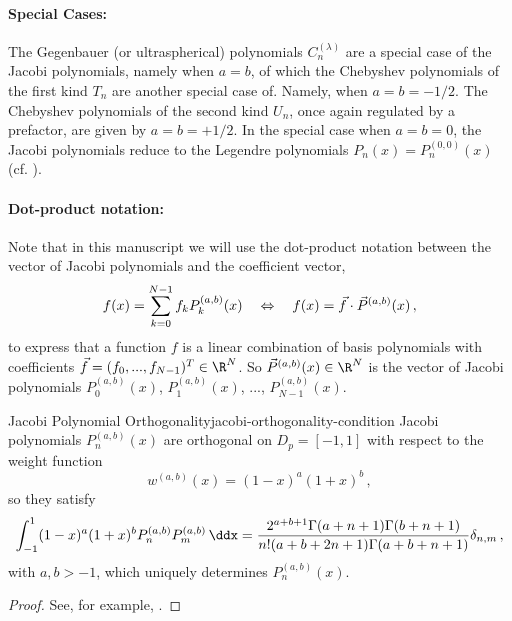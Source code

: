 \paragraph{Special Cases:}
The Gegenbauer (or ultraspherical) polynomials $C_n^{(\lambda)}$ are a special case of the Jacobi polynomials, namely when $a = b$,
of which the Chebyshev polynomials of the first kind $T_n$ are another special case of.
Namely, when $a = b = -1/2$.
The Chebyshev polynomials of the second kind $U_n$, once again regulated by a prefactor, are given by $a = b = +1/2$.
In the special case when $a = b = 0$, the Jacobi polynomials reduce to the Legendre polynomials $P_n(x) = P_n^{(0, 0)}(x)$ (cf. \cite{2018-nist}).


\paragraph{Dot-product notation:}
Note that in this manuscript we will use the dot-product notation between the vector of Jacobi polynomials and the coefficient vector,
$$f(x) = \sum_{k=0}^{N-1} f_k P_k^{(a, b)}(x) \quad\Leftrightarrow\quad f(x) = \vec{f} \cdot \vec{P}^{(a, b)}(x)\,,$$
to express that a function $f$ is a linear combination of basis polynomials with coefficients $\vec{f} = (f_0, ..., f_{N-1})^T \in \R^N$.
So $\vec{P}^{(a, b)}(x) \in \R^N$ is the vector of Jacobi polynomials $P^{(a, b)}_0(x)$, $P^{(a, b)}_1(x)$, ..., $P^{(a, b)}_{N-1}(x)$.

\begin{theorem}{Jacobi Polynomial Orthogonality}{jacobi-orthogonality-condition}
  Jacobi polynomials $P_n^{(a,b)}(x)$ are orthogonal on $D_p = [-1,1]$ with respect to the weight function
  \begin{equation*}
    w^{(a,b)}(x)=(1-x)^a (1+x)^b\,,
  \end{equation*}
  so they satisfy
  \begin{align*}
    \int_{-1}^1(1-x)^a(1+x)^bP_n^{(a,b)}P_m^{(a,b)}\,\ddx = \frac{2^{a+b+1} \Gamma (a+n+1) \Gamma (b+n+1)}{n! (a+b+2 n+1) \Gamma (a+b+n+1)} \delta_{n,m}\,,
  \end{align*}
  with $a	,b>-1$, which uniquely determines $P_n^{(a,b)}(x)$.
\end{theorem}
\begin{proof}
  See, for example, \cite{1995-jacobi-orthogonality-proof}.
\end{proof}

